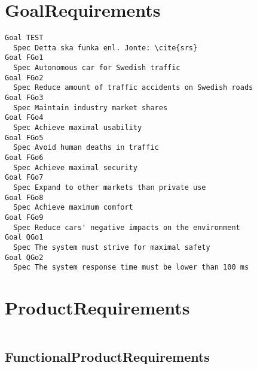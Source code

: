 \begin{lstlisting}

\end{lstlisting}


       \section{GoalRequirements}


\begin{lstlisting}
Goal TEST
  Spec Detta ska funka enl. Jonte: \cite{srs}
Goal FGo1
  Spec Autonomous car for Swedish traffic
Goal FGo2
  Spec Reduce amount of traffic accidents on Swedish roads
Goal FGo3
  Spec Maintain industry market shares
Goal FGo4
  Spec Achieve maximal usability
Goal FGo5
  Spec Avoid human deaths in traffic
Goal FGo6
  Spec Achieve maximal security
Goal FGo7
  Spec Expand to other markets than private use
Goal FGo8
  Spec Achieve maximum comfort
Goal FGo9
  Spec Reduce cars' negative impacts on the environment
Goal QGo1
  Spec The system must strive for maximal safety
Goal QGo2
  Spec The system response time must be lower than 100 ms

\end{lstlisting}
    
        
       \section{ProductRequirements}


\begin{lstlisting}

\end{lstlisting}


       \subsection{FunctionalProductRequirements}


